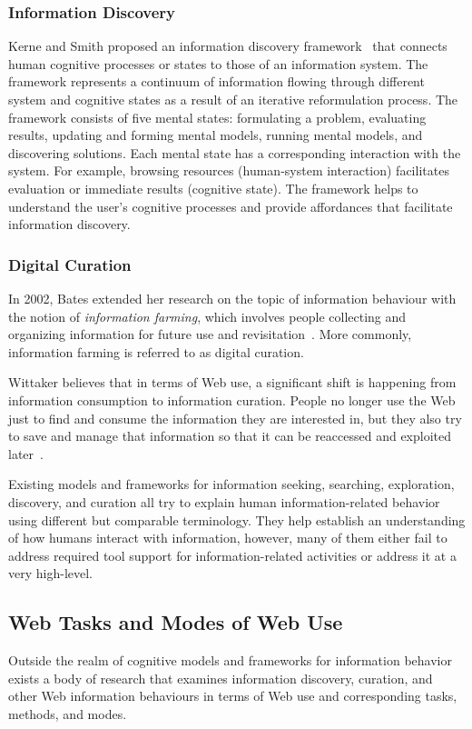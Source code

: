 \documentclass{sigchi}
\begin{document}
\subsubsection{Information Discovery}
Kerne and Smith proposed an information discovery framework~\cite{kerne2004information} that connects human cognitive processes or states to those of an information system. The framework represents a continuum of information flowing through different system and cognitive states as a result of an iterative reformulation process. The framework consists of five mental states: formulating a problem, evaluating results, updating and forming mental models, running mental models, and discovering solutions. Each mental state has a corresponding interaction with the system. For example, browsing resources (human-system interaction) facilitates evaluation or immediate results (cognitive state). The framework helps to understand the user's cognitive processes and provide affordances that facilitate information discovery.
   
\subsubsection{Digital Curation}
In 2002, Bates extended her research on the topic of information behaviour with the notion of \textit{information farming}, which involves people collecting and organizing information for future use and revisitation~\cite{bates2002toward}. More commonly, information farming is referred to as digital curation. 

Wittaker believes that in terms of Web use, a significant shift is happening from information consumption to information curation. People no longer use the Web just to find and consume the information they are interested in, but they also try to save and manage that information so that it can be reaccessed and exploited later~\cite{whittaker2011personal}. 

Existing models and frameworks for information seeking, searching, exploration, discovery, and curation all try to explain human information-related behavior using different but comparable terminology. They help establish an understanding of how humans interact with information, however, many of them either fail to address required tool support for information-related activities or address it at a very high-level.  

\subsection{Web Tasks and Modes of Web Use}
Outside the realm of cognitive models and frameworks for information behavior exists a body of research that examines information discovery, curation, and other Web information behaviours in terms of Web use and corresponding tasks, methods, and modes.
\end{document}
